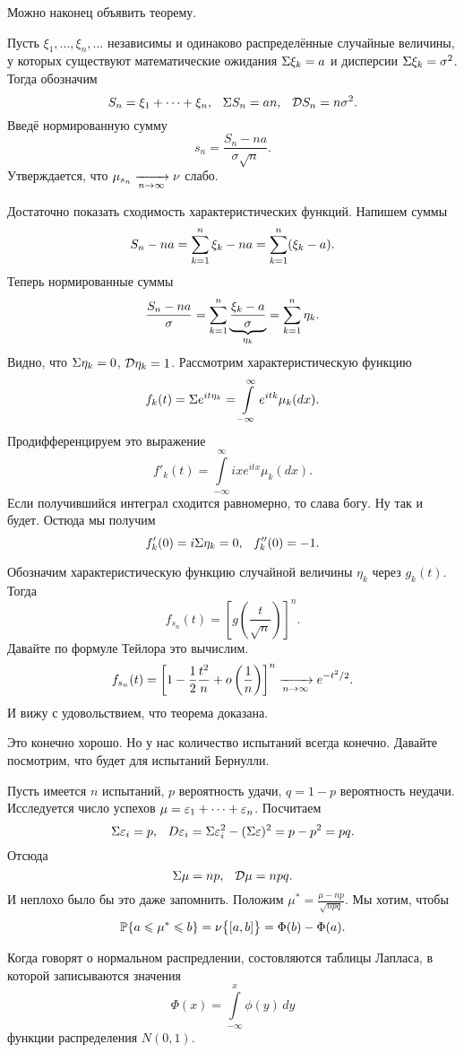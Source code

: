 Можно наконец объявить теорему.
\begin{The}
Пусть $\xi_1,\dots,\xi_n,\dots$ независимы и одинаково распределённые случайные величины, у которых существуют математические ожидания $\E\xi_k=a$ и дисперсии $\E\xi_k= \sigma^2$. Тогда обозначим
\[
  S_n = \xi_1 + \dots +\xi_n,\pau \E S_n = an, \pau \D S_n = n\sigma^2.
\]
Введё нормированную сумму
\[
  s_n = \frac{ S_n - na}{\sigma\sqrt{n}}.
\]
Утверждается, что $\mu_{s_n} \te \nu$ слабо.
\end{The}
\begin{Proof}
Достаточно показать сходимость характеристических функций. Напишем суммы
\[
  S_n - na = \RY k1n \xi_k - na = \RY k1n (\xi_k-a).
\]
Теперь нормированные суммы
\[
  \frac{S_n-na}{\sigma} = \RY k1n \underbrace{\frac{\xi_k-a}{\sigma}}_{\eta_k} =\RY k1n\eta_k.
\]
Видно, что $\E\eta_k = 0$, $\D\eta_k = 1$. Рассмотрим характеристическую функцию
\[
  f_k(t) = \E e^{it\eta_k} = \int\limits_{-\infty}^{\infty} e^{itk}\mu_k(dx).
\]
Продифференцируем это выражение
\[
  f'_k(t) =  \int\limits_{-\infty}^{\infty} ixe^{itx} \mu_k(dx).
\]
Если получившийся интеграл сходится равномерно, то слава богу. Ну так и будет. Остюда мы получим
\[
  f'_k(0) = i\E\eta_k = 0, \pau f''_k(0) = -1.
\]

Обозначим характеристическую функцию случайной величины $\eta_k$ через $g_k(t)$. Тогда
\[
  f_{s_n}(t) = \left[g\left(\frac t{\sqrt n}\right)\right]^n.
\]
Давайте по формуле Тейлора это вычислим.
\[
  f_{s_n}(t) = \left[1 - \frac12\frac{t^2}n + o\left( \frac1n \right)\right]^n \te e^{-t^2/2}.
\]
И вижу с удовольствием, что теорема доказана.
\end{Proof}

Это конечно хорошо. Но у нас количество испытаний всегда конечно. Давайте посмотрим, что будет для испытаний Бернулли.

Пусть имеется $n$ испытаний, $p$ вероятность удачи, $q=1-p$ вероятность неудачи. Исследуется число успехов $\mu = \e_1 + \dots + \e_n$. Посчитаем
\[
  \E\e_i = p,\pau D\e_i = \E\e_i^2 - (\E\e)^2 = p - p^2 = pq.
\]
Отсюда
\[
  \E\mu = np,\pau \D\mu = npq.
\]
И неплохо было бы это даже запомнить. Положим $\mu^* = \frac{\mu - np}{\sqrt{npq}}$. Мы хотим, чтобы
\[
  \P\{a\le \mu^*\le b\} = \nu\big\{[a,b]\big\} = \Phi(b) - \Phi(a).
\]

Когда говорят о нормальном распредлении, состовляются таблицы Лапласа, в которой записываются значения
\[
  \Phi(x) = \int\limits_{-\infty}^x \phi(y)\,dy
\]
функции распределения $N(0,1)$.

